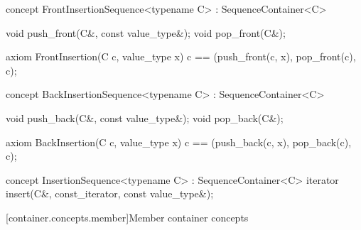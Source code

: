 \documentclass[american,twoside]{book}
\begin{document}
\begin{itemdecl}
concept FrontInsertionSequence<typename C> : SequenceContainer<C> {
  void push_front(C&, const value_type&);
  void pop_front(C&);

  axiom FrontInsertion(C c, value_type x) {
    c == (push_front(c, x), pop_front(c), c);
  }
}
\end{itemdecl}


\begin{itemdescr}
\pnum
{}
\end{itemdescr}

\begin{itemdecl}
concept BackInsertionSequence<typename C> : SequenceContainer<C> {
  void push_back(C&, const value_type&);
  void pop_back(C&);

  axiom BackInsertion(C c, value_type x) {
    c == (push_back(c, x), pop_back(c), c);
  }
}
\end{itemdecl}


\begin{itemdescr}
\pnum
{}
\end{itemdescr}


\begin{itemdecl}
concept InsertionSequence<typename C> : SequenceContainer<C> {
  iterator insert(C&, const_iterator, const value_type&);
}
\end{itemdecl}

\begin{itemdescr}
\pnum
{}
\end{itemdescr}

[container.concepts.member]{Member container concepts} 

\pnum 
{}
\end{document}
